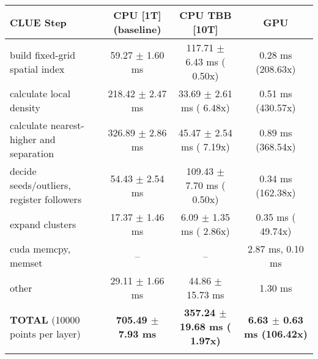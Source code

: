     \begin{tabular}{l|c|c|c}
    \hline
    CLUE Step                                 & CPU [1T] (baseline)         & CPU TBB [10T]                         & GPU                       \\ \hline
    build fixed-grid spatial index            &  59.27 $\pm$  1.60 ms       & 117.71 $\pm$  6.43 ms ( 0.50x)        &   0.28 ms (208.63x)       \\
    calculate local density                   & 218.42 $\pm$  2.47 ms       &  33.69 $\pm$  2.61 ms ( 6.48x)        &   0.51 ms (430.57x)       \\
    calculate nearest-higher and separation   & 326.89 $\pm$  2.86 ms       &  45.47 $\pm$  2.54 ms ( 7.19x)        &   0.89 ms (368.54x)       \\
    decide seeds/outliers, register followers &  54.43 $\pm$  2.54 ms       & 109.43 $\pm$  7.70 ms ( 0.50x)        &   0.34 ms (162.38x)       \\
    expand clusters                           &  17.37 $\pm$  1.46 ms       &   6.09 $\pm$  1.35 ms ( 2.86x)        &   0.35 ms ( 49.74x)       \\ \hline
    cuda memcpy, memset                       & --                          & --                                    &   2.87 ms,   0.10 ms      \\ 
    other                                     &  29.11 $\pm$  1.66 ms       &  44.86 $\pm$ 15.73 ms                 &   1.30 ms                 \\ \hline
    \textbf{TOTAL} (10000 points per layer)   & \textbf{705.49 $\pm$  7.93 ms} & \textbf{357.24 $\pm$ 19.68 ms ( 1.97x)} & \textbf{  6.63 $\pm$  0.63 ms (106.42x)}  \\
    \hline
    \multicolumn{4}{c}{} 
    \end{tabular}
    \linebreak


